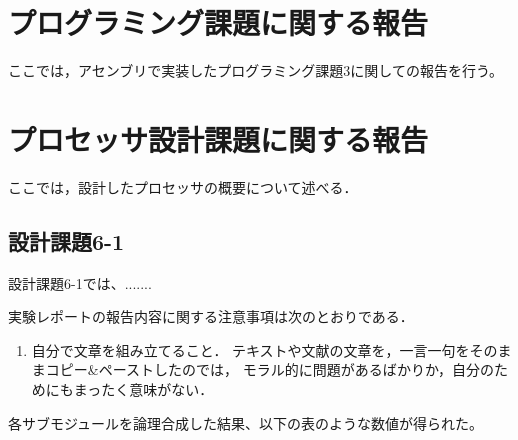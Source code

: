\documentclass{jarticle}[11pt]
\begin{document}
\newpage


\section{プログラミング課題に関する報告}
\label{sec:プログラミング課題に関する報告}

ここでは，アセンブリで実装したプログラミング課題3に関しての報告を行う。




\section{プロセッサ設計課題に関する報告}
\label{sec:プロセッサ設計課題に関する報告}

ここでは，設計したプロセッサの概要について述べる．

\subsection{設計課題6-1}

設計課題6-1では、.......

実験レポートの報告内容に関する注意事項は次のとおりである．
\begin{enumerate}
\item 自分で文章を組み立てること．
テキストや文献の文章を，一言一句をそのままコピー\&ペーストしたのでは，
モラル的に問題があるばかりか，自分のためにもまったく意味がない．
\end{enumerate}


各サブモジュールを論理合成した結果、以下の表のような数値が得られた。
\end{document}
